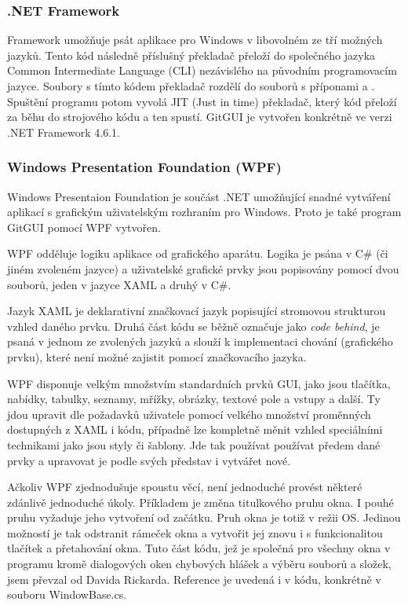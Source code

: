 \documentclass[
  biblatex,
  glossaries,
  index
]{kidiplom}
\begin{document}
\subsubsection{.NET Framework}
Framework umožňuje psát aplikace pro Windows v libovolném ze tří možných jazyků. Tento kód následně příslušný překladač přeloží do společného jazyka Common Intermediate Language (CLI) nezávislého na původním programovacím jazyce. Soubory s tímto kódem překladač rozdělí do souborů s příponami  a . Spuštění programu potom vyvolá JIT (Just in time) překladač, který kód přeloží za běhu do strojového kódu a ten spustí. GitGUI je vytvořen konkrétně ve verzi .NET Framework 4.6.1.

\subsubsection{Windows Presentation Foundation (WPF)}
Windows Presentaion Foundation je součást .NET umožňující snadné vytváření aplikací s grafickým uživatelským rozhraním pro Windows. Proto je také program GitGUI pomocí WPF vytvořen.

WPF odděluje logiku aplikace od grafického aparátu. Logika je psána v C\# (či jiném zvoleném jazyce) a uživatelské grafické prvky jsou popisovány pomocí dvou souborů, jeden v jazyce XAML a druhý v C\#.

Jazyk XAML je deklarativní značkovací jazyk popisující stromovou strukturou vzhled daného prvku. Druhá část kódu se běžně označuje jako {\it code behind}, je psaná v jednom ze zvolených jazyků a slouží k implementaci chování (grafického prvku), které není možné zajistit pomocí značkovacího jazyka.

WPF disponuje velkým množstvím standardních prvků GUI, jako jsou tlačítka, nabídky, tabulky, seznamy, mřížky, obrázky, textové pole a vstupy a další. Ty jdou upravit dle požadavků uživatele pomocí velkého množství proměnných dostupných z XAML i kódu, případně lze kompletně měnit vzhled speciálními technikami jako jsou styly či šablony. Jde tak používat používat předem dané prvky a upravovat je podle svých představ i vytvářet nové.

Ačkoliv WPF zjednodušuje spoustu věcí, není jednoduché provést některé zdánlivě jednoduché úkoly. Příkladem je změna titulkového pruhu okna. I pouhé  pruhu vyžaduje jeho vytvoření od začátku. Pruh okna je totiž v režii OS. Jedinou možností je tak odstranit rámeček okna a vytvořit jej znovu i s funkcionalitou tlačítek a přetahování okna. Tuto část kódu, jež je společná pro všechny okna v programu kromě dialogových oken chybových hlášek a výběru souborů a složek, jsem převzal od Davida Rickarda. Reference je uvedená i v kódu, konkrétně v souboru WindowBase.cs. 
\end{document}
